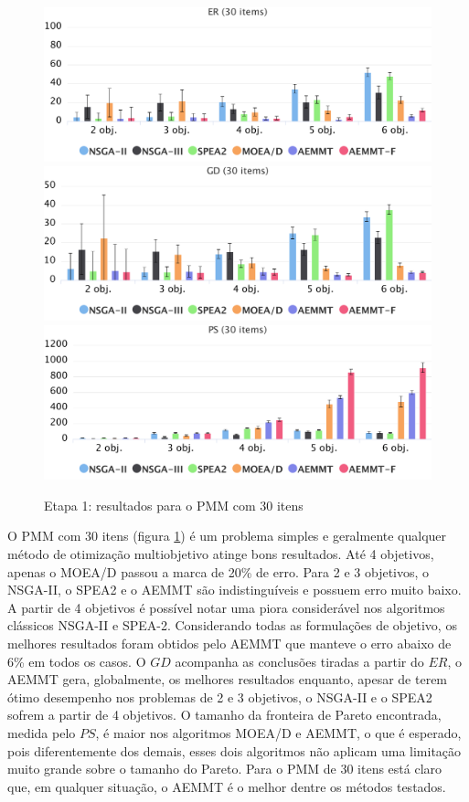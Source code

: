 \begin{figure}[!htbp]
	\caption{Etapa 1: resultados para o PMM com 30 itens}
	\label{fig_exp1_mkp_30}
	\includegraphics[width=1\textwidth]{cap_experimentos/figs/etapa1/er-mkp-30}
	\includegraphics[width=1\textwidth]{cap_experimentos/figs/etapa1/gd-mkp-30}
	\includegraphics[width=1\textwidth]{cap_experimentos/figs/etapa1/ps-mkp-30}
\end{figure}

O PMM com 30 itens (figura \ref{fig_exp1_mkp_30}) é um problema simples e geralmente qualquer método de otimização multiobjetivo atinge bons resultados. Até 4 objetivos, apenas o MOEA/D passou a marca de 20\% de erro. Para 2 e 3 objetivos, o NSGA-II, o SPEA2 e o AEMMT são indistinguíveis e possuem erro muito baixo. A partir de 4 objetivos é possível notar uma piora considerável nos algoritmos clássicos NSGA-II e SPEA-2. Considerando todas as formulações de objetivo, os melhores resultados foram obtidos pelo AEMMT que manteve o erro abaixo de 6\% em todos os casos. O $GD$ acompanha as conclusões tiradas a partir do $ER$, o AEMMT gera, globalmente, os melhores resultados enquanto, apesar de terem ótimo desempenho nos problemas de 2 e 3 objetivos, o NSGA-II e o SPEA2 sofrem a partir de 4 objetivos. O tamanho da fronteira de Pareto encontrada, medida pelo $PS$, é maior nos algoritmos MOEA/D e AEMMT, o que é esperado, pois diferentemente dos demais, esses dois algoritmos não aplicam uma limitação muito grande sobre o tamanho do Pareto. Para o PMM de 30 itens está claro que, em qualquer situação, o AEMMT é o melhor dentre os métodos testados.

